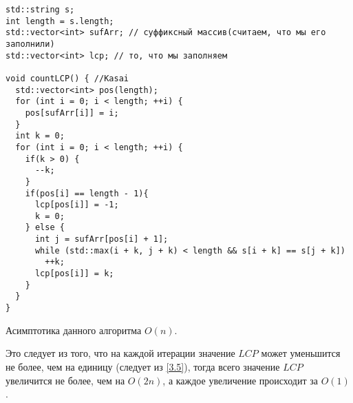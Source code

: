 \begin{lstlisting}
std::string s;
int length = s.length;
std::vector<int> sufArr; // суффиксный массив(считаем, что мы его заполнили)
std::vector<int> lcp; // то, что мы заполняем

void countLCP() { //Kasai
  std::vector<int> pos(length);
  for (int i = 0; i < length; ++i) {
    pos[sufArr[i]] = i;
  }
  int k = 0;
  for (int i = 0; i < length; ++i) {
    if(k > 0) {
      --k;
    }
    if(pos[i] == length - 1){
      lcp[pos[i]] = -1;
      k = 0;
    } else {
      int j = sufArr[pos[i] + 1];
      while (std::max(i + k, j + k) < length && s[i + k] == s[j + k])
        ++k;
      lcp[pos[i]] = k;
    }
  }
}
\end{lstlisting}

\begin{remark}
        Асимптотика данного алгоритма $O(n)$.
\end{remark}
Это следует из того, что на каждой итерации значение $LCP$ может уменьшится не более, чем на единицу
(следует из \ref{3.5}), тогда всего значение $LCP$ увеличится не более, чем на $O(2n)$, а каждое увеличение
происходит за  $O(1)$.
